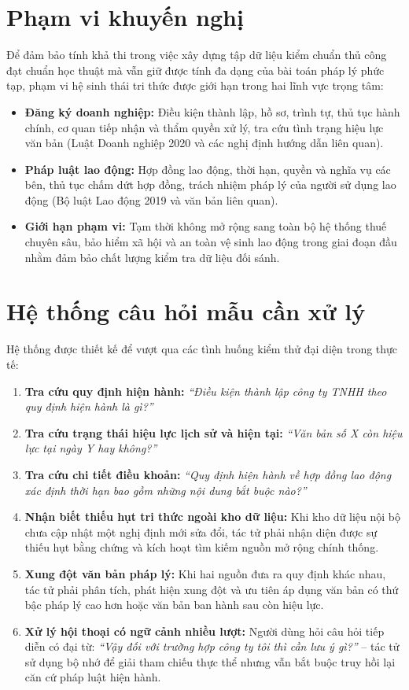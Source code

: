 \section{Phạm vi khuyến nghị}

Để đảm bảo tính khả thi trong việc xây dựng tập dữ liệu kiểm chuẩn thủ công đạt chuẩn học thuật mà vẫn giữ được tính đa dạng của bài toán pháp lý phức tạp, phạm vi hệ sinh thái tri thức được giới hạn trong hai lĩnh vực trọng tâm:
\begin{itemize}
    \item \textbf{Đăng ký doanh nghiệp:} Điều kiện thành lập, hồ sơ, trình tự, thủ tục hành chính, cơ quan tiếp nhận và thẩm quyền xử lý, tra cứu tình trạng hiệu lực văn bản (Luật Doanh nghiệp 2020 và các nghị định hướng dẫn liên quan).
    \item \textbf{Pháp luật lao động:} Hợp đồng lao động, thời hạn, quyền và nghĩa vụ các bên, thủ tục chấm dứt hợp đồng, trách nhiệm pháp lý của người sử dụng lao động (Bộ luật Lao động 2019 và văn bản liên quan).
    \item \textbf{Giới hạn phạm vi:} Tạm thời không mở rộng sang toàn bộ hệ thống thuế chuyên sâu, bảo hiểm xã hội và an toàn vệ sinh lao động trong giai đoạn đầu nhằm đảm bảo chất lượng kiểm tra dữ liệu đối sánh.
\end{itemize}

\section{Hệ thống câu hỏi mẫu cần xử lý}

Hệ thống được thiết kế để vượt qua các tình huống kiểm thử đại diện trong thực tế:
\begin{enumerate}
    \item \textbf{Tra cứu quy định hiện hành:} \textit{“Điều kiện thành lập công ty TNHH theo quy định hiện hành là gì?”}
    \item \textbf{Tra cứu trạng thái hiệu lực lịch sử và hiện tại:} \textit{“Văn bản số X còn hiệu lực tại ngày Y hay không?”}
    \item \textbf{Tra cứu chi tiết điều khoản:} \textit{“Quy định hiện hành về hợp đồng lao động xác định thời hạn bao gồm những nội dung bắt buộc nào?”}
    \item \textbf{Nhận biết thiếu hụt tri thức ngoài kho dữ liệu:} Khi kho dữ liệu nội bộ chưa cập nhật một nghị định mới sửa đổi, tác tử phải nhận diện được sự thiếu hụt bằng chứng và kích hoạt tìm kiếm nguồn mở rộng chính thống.
    \item \textbf{Xung đột văn bản pháp lý:} Khi hai nguồn đưa ra quy định khác nhau, tác tử phải phân tích, phát hiện xung đột và ưu tiên áp dụng văn bản có thứ bậc pháp lý cao hơn hoặc văn bản ban hành sau còn hiệu lực.
    \item \textbf{Xử lý hội thoại có ngữ cảnh nhiều lượt:} Người dùng hỏi câu hỏi tiếp diễn có đại từ: \textit{“Vậy đối với trường hợp công ty tôi thì cần lưu ý gì?”} -- tác tử sử dụng bộ nhớ để giải tham chiếu thực thể nhưng vẫn bắt buộc truy hồi lại căn cứ pháp luật hiện hành.
\end{enumerate}

